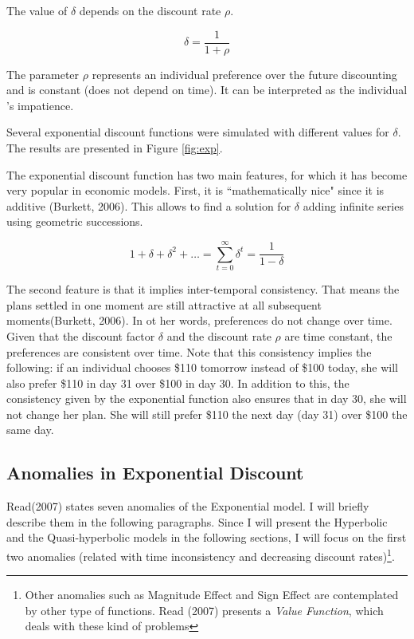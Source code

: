 \documentclass[]{article}
\begin{document}
The value of \(\delta\) depends on the discount rate \(\rho\).

\[
\delta = \frac{1}{1+\rho}
\]

The parameter \(\rho\) represents an individual preference over the future discounting and is constant (does not depend on time). It can be interpreted as the individual 's impatience.

Several exponential discount functions were simulated with different values for \(\delta\). The results are presented in Figure \ref{fig:exp}.

The exponential discount function has two main features, for which it has become very popular in economic models. First, it is ``mathematically nice" since it is additive (Burkett, 2006). This allows to find a solution for \(\delta\) adding infinite series using geometric successions.

\[
1 + \delta + \delta^2 + \dots = \sum_{t=0}^{\infty}\delta^t = \frac{1}{1 - \delta}
\]

The second feature is that it implies inter-temporal consistency. That means the plans settled in one moment are still attractive at all subsequent moments(Burkett, 2006). In ot her words, preferences do not change over time. Given that the discount factor \(\delta\) and the discount rate \(\rho\) are time constant, the preferences are consistent over time. Note that this consistency implies the following: if an individual chooses \$110 tomorrow instead of \$100 today, she will also prefer \$110 in day 31 over \$100 in day 30. In addition to this, the consistency given by the exponential function also ensures that in day 30, she will not change her plan. She will still prefer \$110 the next day (day 31) over \$100 the same day.

\hypertarget{anomalies-in-exponential-discount}{%
\subsection{Anomalies in Exponential Discount}\label{anomalies-in-exponential-discount}}

Read(2007) states seven anomalies of the Exponential model. I will briefly describe them in the following paragraphs. Since I will present the Hyperbolic and the Quasi-hyperbolic models in the following sections, I will focus on the first two anomalies (related with time inconsistency and decreasing discount rates)\footnote{Other anomalies such as Magnitude Effect and Sign Effect are contemplated by other type of functions. Read (2007) presents a \emph{Value Function}, which deals with these kind of problems}.
\end{document}
